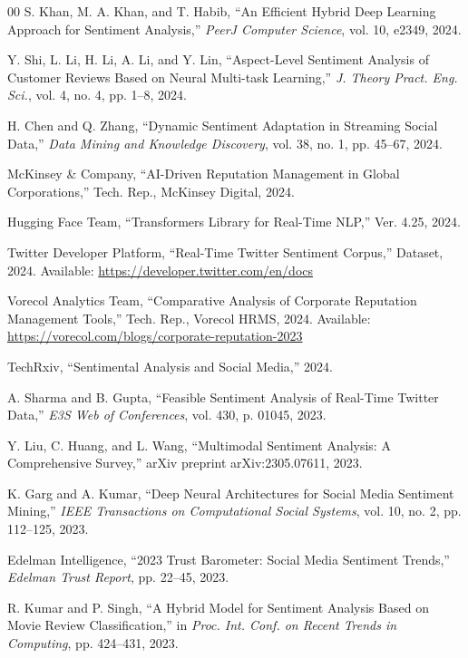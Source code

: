 \documentclass[conference]{IEEEtran}
\begin{document}
\begin{thebibliography}{00}
S. Khan, M. A. Khan, and T. Habib, 
``An Efficient Hybrid Deep Learning Approach for Sentiment Analysis,'' 
\textit{PeerJ Computer Science}, vol. 10, e2349, 2024.

Y. Shi, L. Li, H. Li, A. Li, and Y. Lin, 
``Aspect-Level Sentiment Analysis of Customer Reviews Based on Neural Multi-task Learning,'' 
\textit{J. Theory Pract. Eng. Sci.}, vol. 4, no. 4, pp. 1--8, 2024.

H. Chen and Q. Zhang, 
``Dynamic Sentiment Adaptation in Streaming Social Data,'' 
\textit{Data Mining and Knowledge Discovery}, vol. 38, no. 1, pp. 45--67, 2024.

McKinsey \& Company, 
``AI-Driven Reputation Management in Global Corporations,'' 
Tech. Rep., McKinsey Digital, 2024.

Hugging Face Team, 
``Transformers Library for Real-Time NLP,'' 
Ver. 4.25, 2024.

Twitter Developer Platform, 
``Real-Time Twitter Sentiment Corpus,'' 
Dataset, 2024. Available: \url{https://developer.twitter.com/en/docs}

Vorecol Analytics Team, 
``Comparative Analysis of Corporate Reputation Management Tools,'' 
Tech. Rep., Vorecol HRMS, 2024. Available: \url{https://vorecol.com/blogs/corporate-reputation-2023}

TechRxiv, 
``Sentimental Analysis and Social Media,'' 
2024.

A. Sharma and B. Gupta, 
``Feasible Sentiment Analysis of Real-Time Twitter Data,'' 
\textit{E3S Web of Conferences}, vol. 430, p. 01045, 2023.

Y. Liu, C. Huang, and L. Wang, 
``Multimodal Sentiment Analysis: A Comprehensive Survey,'' 
arXiv preprint arXiv:2305.07611, 2023.

K. Garg and A. Kumar, 
``Deep Neural Architectures for Social Media Sentiment Mining,'' 
\textit{IEEE Transactions on Computational Social Systems}, vol. 10, no. 2, pp. 112--125, 2023.

Edelman Intelligence, 
``2023 Trust Barometer: Social Media Sentiment Trends,'' 
\textit{Edelman Trust Report}, pp. 22--45, 2023.

R. Kumar and P. Singh, 
``A Hybrid Model for Sentiment Analysis Based on Movie Review Classification,'' 
in \textit{Proc. Int. Conf. on Recent Trends in Computing}, pp. 424--431, 2023.


\end{thebibliography}
\end{document}

